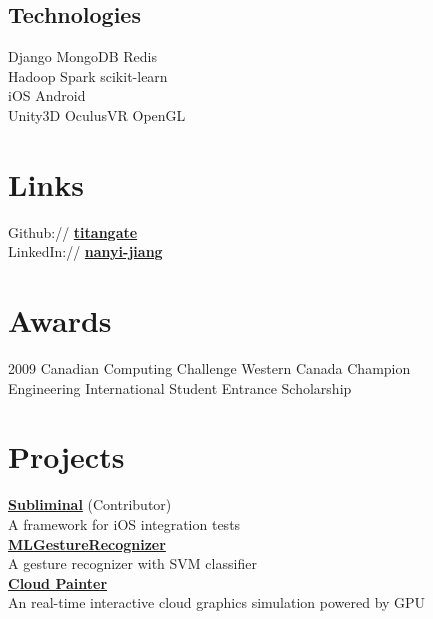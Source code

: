 \documentclass[letterpaper]{deedy-resume} %
\begin{document}
\begin{minipage}[t]{0.33\textwidth}
\sectionspace %
\subsection{Technologies}
Django \textbullet{} MongoDB \textbullet{} Redis \\
\sectionspace %
Hadoop \textbullet{} Spark \textbullet{} scikit-learn \\
\sectionspace %
iOS \textbullet{} Android \\
\sectionspace %
Unity3D \textbullet{} OculusVR \textbullet{} OpenGL \\

\sectionspace %

\section{Links} 

Github:// \href{https://github.com/titangate}{\bf titangate} \\
LinkedIn:// \href{ca.linkedin.com/pub/nanyi-jiang/55/8a2/9ba/}{\bf nanyi-jiang} \\

\section{Awards}
2009 Canadian Computing Challenge Western Canada Champion \\
Engineering International Student Entrance Scholarship \\
\section{Projects}
\href{https://github.com/inkling/Subliminal}{\textbf{Subliminal}} (Contributor) \\ A framework for iOS integration tests\\
\href{https://github.com/titangate/GestureRecognizerML}{\textbf{MLGestureRecognizer}} \\ A gesture recognizer with SVM classifier \\
\href{https://github.com/titangate/CloudPainter}{\textbf{Cloud Painter}} \\ An real-time interactive cloud graphics simulation powered by GPU \\ 

\end{minipage} %
\end{document}
